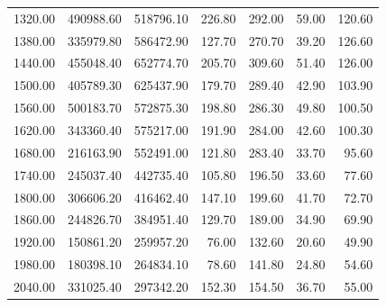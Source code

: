 \begin{tabular}{r|rr|rr|rr|}
1320.00 & 490988.60 & 518796.10 & 226.80 & 292.00 & 59.00 & 120.60 \\
1380.00 & 335979.80 & 586472.90 & 127.70 & 270.70 & 39.20 & 126.60 \\
1440.00 & 455048.40 & 652774.70 & 205.70 & 309.60 & 51.40 & 126.00 \\
1500.00 & 405789.30 & 625437.90 & 179.70 & 289.40 & 42.90 & 103.90 \\
1560.00 & 500183.70 & 572875.30 & 198.80 & 286.30 & 49.80 & 100.50 \\
1620.00 & 343360.40 & 575217.00 & 191.90 & 284.00 & 42.60 & 100.30 \\
1680.00 & 216163.90 & 552491.00 & 121.80 & 283.40 & 33.70 & 95.60 \\
1740.00 & 245037.40 & 442735.40 & 105.80 & 196.50 & 33.60 & 77.60 \\
1800.00 & 306606.20 & 416462.40 & 147.10 & 199.60 & 41.70 & 72.70 \\
1860.00 & 244826.70 & 384951.40 & 129.70 & 189.00 & 34.90 & 69.90 \\
1920.00 & 150861.20 & 259957.20 & 76.00 & 132.60 & 20.60 & 49.90 \\
1980.00 & 180398.10 & 264834.10 & 78.60 & 141.80 & 24.80 & 54.60 \\
2040.00 & 331025.40 & 297342.20 & 152.30 & 154.50 & 36.70 & 55.00 \\
\bottomrule
\end{tabular}


